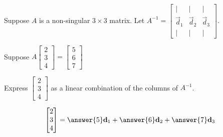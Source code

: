 \documentclass{ximera}
\author{Anna Davis}
\begin{document}
\begin{exercise}
Suppose $A$ is a non-singular $3\times 3$ matrix.  Let $A^{-1}=\begin{bmatrix}|&|&|\\\vec{d}_1& \vec{d}_2 & \vec{d}_3\\|&|&|\end{bmatrix}$.

Suppose $A\begin{bmatrix}2\\3\\4\end{bmatrix}=\begin{bmatrix}5\\6\\7\end{bmatrix}$

Express $\begin{bmatrix}2\\3\\4\end{bmatrix}$ as a linear combination of the columns of $A^{-1}$.

$$\begin{bmatrix}2\\3\\4\end{bmatrix}=\answer{5}\vec{d}_1+\answer{6}\vec{d}_2+\answer{7}\vec{d}_3$$
\end{exercise}
\end{document}
